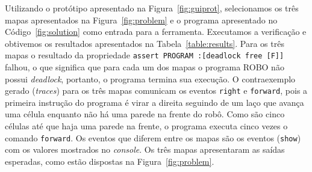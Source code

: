 \begin{table}[h]
\caption{Entradas e saídas para o mapa 2}
\label{table:map2}
\end{table}

\begin{table}[h]
\caption{Entradas e saídas para o mapa 3}
\label{table:map3}
\end{table}

Utilizando o protótipo apresentado na Figura~\ref{fig:guiprot}, selecionamos os três mapas apresentados na Figura~\ref{fig:problem} e o programa apresentado no Código~\ref{fig:solution} como entrada para a ferramenta. Executamos a verificação e obtivemos os resultados apresentados na Tabela~\ref{table:results}. Para os três mapas o resultado da propriedade \texttt{assert PROGRAM :[deadlock free [F]]} falhou, o que significa que para cada um dos mapas o programa ROBO não possui \textit{deadlock}, portanto, o programa termina sua execução. O contraexemplo gerado (\textit{traces}) para os três mapas comunicam os eventos \texttt{right} e \texttt{forward}, pois a primeira instrução do programa é virar a direita seguindo de um laço que avança uma célula enquanto não há uma parede na frente do robô. Como são cinco células até que haja uma parede na frente, o programa executa cinco vezes o comando \texttt{forward}. Os eventos que diferem entre os mapas são os eventos (\texttt{show}) com os valores mostrados no \textit{console}. Os três mapas apresentaram as saídas esperadas, como estão dispostas na Figura~\ref{fig:problem}.

